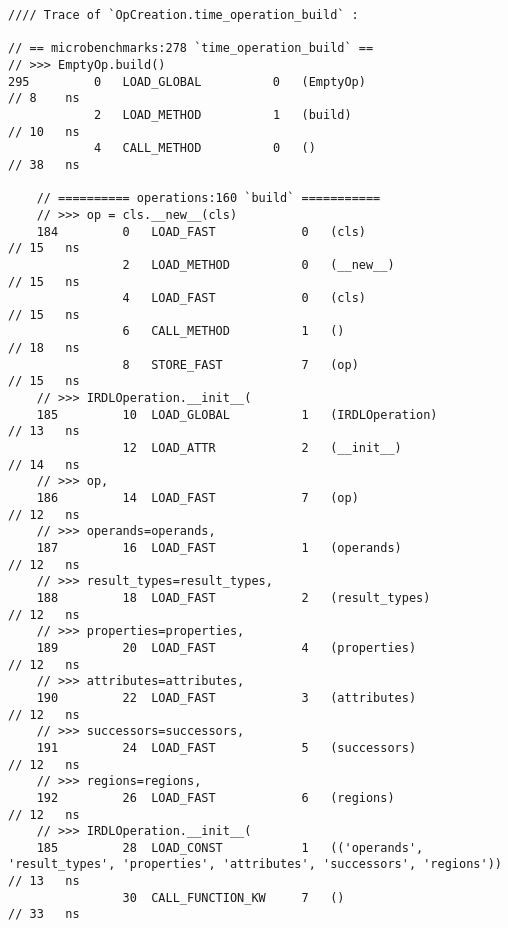 \vspace{2em}
\begin{code}
    \begin{verbatim}
//// Trace of `OpCreation.time_operation_build` :

// == microbenchmarks:278 `time_operation_build` ==
// >>> EmptyOp.build()
295         0   LOAD_GLOBAL          0   (EmptyOp)                                                  // 8    ns
            2   LOAD_METHOD          1   (build)                                                    // 10   ns
            4   CALL_METHOD          0   ()                                                         // 38   ns

    // ========== operations:160 `build` ===========
    // >>> op = cls.__new__(cls)
    184         0   LOAD_FAST            0   (cls)                                                  // 15   ns
                2   LOAD_METHOD          0   (__new__)                                              // 15   ns
                4   LOAD_FAST            0   (cls)                                                  // 15   ns
                6   CALL_METHOD          1   ()                                                     // 18   ns
                8   STORE_FAST           7   (op)                                                   // 15   ns
    // >>> IRDLOperation.__init__(
    185         10  LOAD_GLOBAL          1   (IRDLOperation)                                        // 13   ns
                12  LOAD_ATTR            2   (__init__)                                             // 14   ns
    // >>> op,
    186         14  LOAD_FAST            7   (op)                                                   // 12   ns
    // >>> operands=operands,
    187         16  LOAD_FAST            1   (operands)                                             // 12   ns
    // >>> result_types=result_types,
    188         18  LOAD_FAST            2   (result_types)                                         // 12   ns
    // >>> properties=properties,
    189         20  LOAD_FAST            4   (properties)                                           // 12   ns
    // >>> attributes=attributes,
    190         22  LOAD_FAST            3   (attributes)                                           // 12   ns
    // >>> successors=successors,
    191         24  LOAD_FAST            5   (successors)                                           // 12   ns
    // >>> regions=regions,
    192         26  LOAD_FAST            6   (regions)                                              // 12   ns
    // >>> IRDLOperation.__init__(
    185         28  LOAD_CONST           1   (('operands', 'result_types', 'properties', 'attributes', 'successors', 'regions'))  // 13   ns
                30  CALL_FUNCTION_KW     7   ()                                                     // 33   ns


\end{verbatim}
\end{code}
